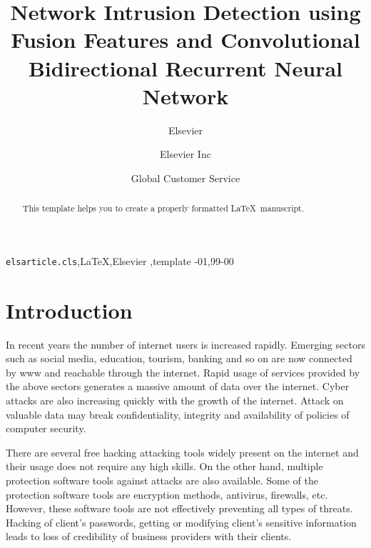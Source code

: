 \documentclass[review]{elsarticle}
\begin{document}
\begin{frontmatter}

\title{Network Intrusion Detection using Fusion Features and Convolutional Bidirectional Recurrent Neural Network }

\author{Elsevier}
\address{Radarweg 29, Amsterdam}

\author[mymainaddress,mysecondaryaddress]{Elsevier Inc}

\author[mysecondaryaddress]{Global Customer Service}

\address[mymainaddress]{1600 John F Kennedy Boulevard, Philadelphia}
\address[mysecondaryaddress]{360 Park Avenue South, New York}

\begin{abstract}
This template helps you to create a properly formatted \LaTeX\ manuscript.
\end{abstract}

\begin{keyword}
\texttt{elsarticle.cls}\sep \LaTeX\sep Elsevier \sep template
-01\sep  99-00
\end{keyword}

\end{frontmatter}

\linenumbers

\section{Introduction}

In recent years the number of internet users is increased rapidly.  Emerging sectors such as social media, education, tourism, banking and so on are now connected by www and reachable through the internet. Rapid usage of services provided by the above sectors generates a massive amount of data over the internet. Cyber attacks are also increasing quickly with the growth of the internet. 
Attack on valuable data may break confidentiality, integrity and availability of policies of computer security.

There are several free hacking attacking tools widely present on the internet and their usage does not require any high skills.
On the other hand, multiple protection software tools against attacks are also available.
Some of the protection software tools are encryption methods, antivirus, firewalls, etc. However, these software tools are not effectively preventing all types of threats.
Hacking of client’s passwords, getting or modifying client’s sensitive information leads to loss of credibility of business providers with their clients.
\end{document}
